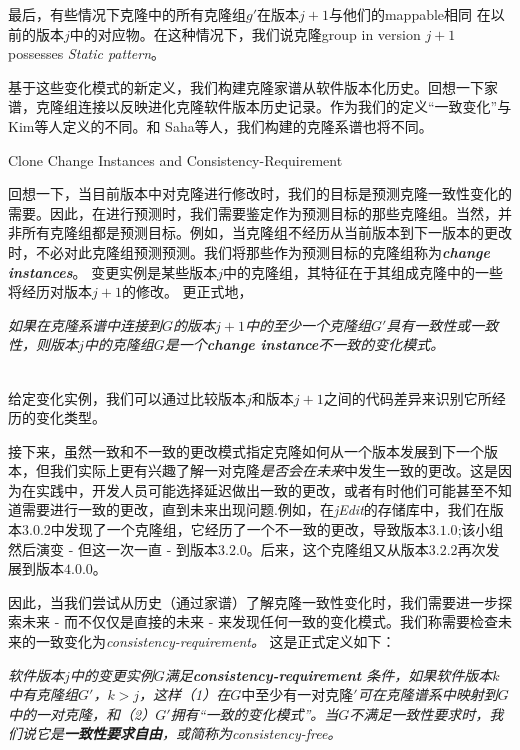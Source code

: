 最后，有些情况下克隆中的所有克隆组$ g'$在版本$ j + 1 $与他们的mappable相同
在以前的版本$ j $中的对应物。在这种情况下，我们说克隆group in version $ j + 1 $ possesses {\em  Static pattern}。

基于这些变化模式的新定义，我们构建克隆家谱从软件版本化历史。回想一下家谱，克隆组连接以反映进化克隆软件版本历史记录。作为我们的定义“一致变化”与Kim等人定义的不同。和 Saha等人，我们构建的克隆系谱也将不同。

 {Clone Change Instances and Consistency-Requirement}
\label {sec：requirement}

回想一下，当目前版本中对克隆进行修改时，我们的目标是预测克隆一致性变化的需要。因此，在进行预测时，我们需要鉴定作为预测目标的那些克隆组。当然，并非所有克隆​​组都是预测目标。例如，当克隆组不经历从当前版本到下一版本的更改时，不必对此克隆组预测预测。我们将那些作为预测目标的克隆组称为{\em {\bf change instances}}。
变更实例是某些版本$ j $中的克隆组，其特征在于其组成克隆中的一些将经历对版本$ j + 1 $的修改。
更正式地，\\

\begin {definition} 
\label {defn-3}
{\em 如果在克隆系谱中连接到$ G $的版本$ j + 1 $中的至少一个克隆组$ G'$具有一致性或一致性，则版本$ j $中的克隆组$ G $是一个{\bf  change instance}不一致的变化模式。
}
\end {definition}

~\\
给定变化实例，我们可以通过比较版本$ j $和版本$ j + 1 $之间的代码差异来识别它所经历的变化类型。

接下来，虽然一致和不一致的更改模式指定克隆如何从一个版本发展到下一个版本，但我们实际上更有兴趣了解一对克隆{\em 是否会在未来}中发生一致的更改。这是因为在实践中，开发人员可能选择延迟做出一致的更改，或者有时他们可能甚至不知道需要进行一致的更改，直到未来出现问题.例如，在{\em  jEdit}的存储库中，我们在版本$ 3.0.2 $中发现了一个克隆组，它经历了一个不一致的更改，导致版本$ 3.1.0 $;该小组然后演变 - 但这一次一直 - 到版本$ 3.2.0 $。后来，这个克隆组又从版本$ 3.2.2 $再次发展到版本$ 4.0.0 $。

因此，当我们尝试从历史（通过家谱）了解克隆一致性变化时，我们需要进一步探索未来 - 而不仅仅是直接的未来 - 来发现任何一致的变化模式。我们称需要检查未来的一致变化为{\em consistency-requirement。}
这是正式定义如下：\\

\begin {definition} 
  \label {defn-4}
  {\em 
    软件版本$ j $中的变更实例$ G $满足{\bf consistency-requirement }条件，如果软件版本$ k $中有克隆组$ G'$，$ k> j $，这样（1）在$ G中至少有一对克隆'$可在克隆谱系中映射到$ G $中的一对克隆，和（2）$ G'$拥有“一致的变化模式”。当$ G $不满足一致性要求时，我们说它是{\bf 一致性要求自由}，或简称为{\em consistency-free}。 
  }
\end {definition}

